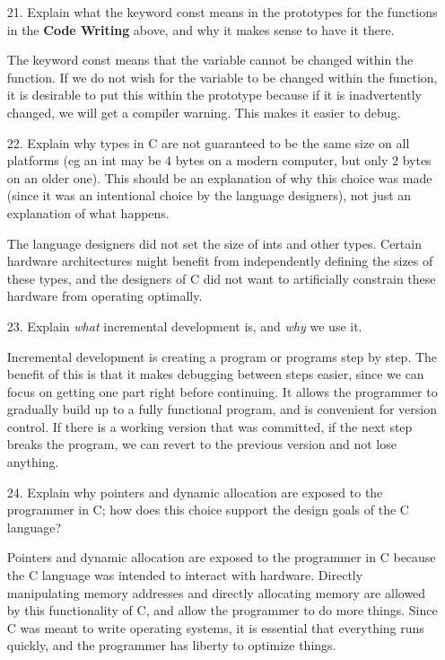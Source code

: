 \documentclass{article}
\begin{document}
\begin{itemize}
	\item[21.] Explain what the keyword const means in the prototypes for the functions in the \textbf{Code Writing} above, and why it makes sense to have it there.
		\begin{answer*}
			The keyword const means that the variable cannot be changed within the function. If we do not wish for the variable to be changed within the function, it is desirable to put this within the prototype because if it is inadvertently changed, we will get a compiler warning. This makes it easier to debug.
		\end{answer*}

	\item[22.] Explain why types in C are not guaranteed to be the same size on all platforms (eg an int may be 4 bytes on a modern computer, but only 2 bytes on an older one). This should be an explanation of why this choice was made (since it was an intentional choice by the language designers), not just an explanation of what happens.
		\begin{answer*}
			The language designers did not set the size of ints and other types. Certain hardware architectures might benefit from independently defining the sizes of these types, and the designers of C did not want to artificially constrain these hardware from operating optimally. 
		\end{answer*}

	\item[23.] Explain \textit{what} incremental development is, and \textit{why} we use it.
		\begin{answer*}
			Incremental development is creating a program or programs step by step. The benefit of this is that it makes debugging between steps easier, since we can focus on getting one part right before continuing. It allows the programmer to gradually build up to a fully functional program, and is convenient for version control. If there is a working version that was committed, if the next step breaks the program, we can revert to the previous version and not lose anything.
		\end{answer*}

	\item[24.] Explain why pointers and dynamic allocation are exposed to the programmer in C; how does this choice support the design goals of the C language?
		\begin{answer*}
			Pointers and dynamic allocation are exposed to the programmer in C because the C language was intended to interact with hardware. Directly manipulating memory addresses and directly allocating memory are allowed by this functionality of C, and allow the programmer to do more things. Since C was meant to write operating systems, it is essential that everything runs quickly, and the programmer has liberty to optimize things.
		\end{answer*}


\end{itemize}
\end{document}
